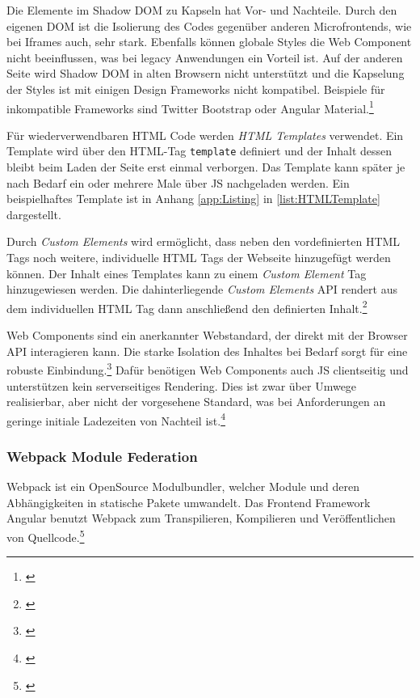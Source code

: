 Die Elemente im Shadow \gls{DOM} zu Kapseln hat Vor- und Nachteile. Durch den eigenen \gls{DOM} ist die Isolierung des Codes gegenüber anderen Microfrontends, wie bei Iframes auch, sehr stark. Ebenfalls können globale Styles die Web Component nicht beeinflussen, was bei legacy Anwendungen ein Vorteil ist. 
Auf der anderen Seite wird Shadow \gls{DOM} in alten Browsern nicht unterstützt und die Kapselung der Styles ist mit einigen Design Frameworks nicht kompatibel. Beispiele für inkompatible Frameworks sind Twitter Bootstrap oder Angular Material.\footnote{\cite[vgl.][96]{Geers2020}}

Für wiederverwendbaren \gls{HTML} Code werden \textit{\gls{HTML} Templates} verwendet. Ein Template wird über den \gls{HTML}-Tag \texttt{template} definiert und der Inhalt dessen bleibt beim Laden der Seite erst einmal verborgen. Das Template kann später je nach Bedarf ein oder mehrere Male über \gls{JS} nachgeladen werden. Ein beispielhaftes Template ist in Anhang \ref{app:Listing} in \cref{list:HTMLTemplate} dargestellt.

Durch \textit{Custom Elements} wird ermöglicht, dass neben den vordefinierten \gls{HTML} Tags noch weitere, individuelle \gls{HTML} Tags der Webseite hinzugefügt werden können. Der Inhalt eines Templates kann zu einem \textit{Custom Element} Tag hinzugewiesen werden. Die dahinterliegende \textit{Custom Elements} API rendert aus dem individuellen \gls{HTML} Tag dann anschließend den definierten Inhalt.\footnote{\cite[vgl.][]{Rauber2021}}

Web Components sind ein anerkannter Webstandard, der direkt mit der Browser \gls{API} interagieren kann. Die starke Isolation des Inhaltes bei Bedarf sorgt für eine robuste Einbindung.\footnote{\cite[vgl.][96\psq]{Geers2020}} Dafür benötigen Web Components auch \gls{JS} clientseitig und unterstützen kein serverseitiges Rendering. Dies ist zwar über Umwege realisierbar, aber nicht der vorgesehene Standard, was bei Anforderungen an geringe initiale Ladezeiten von Nachteil ist.\footnote{\cite[vgl.][97\psq]{Geers2020}}

\subsubsection{Webpack Module Federation}\label{sec:ModuleFederation}

Webpack ist ein OpenSource Modulbundler, welcher Module und deren Abhängigkeiten in statische Pakete umwandelt. Das Frontend Framework Angular benutzt Webpack zum Transpilieren, Kompilieren und Veröffentlichen von Quellcode.\footnote{\cite[vgl.][133]{Clow2018}}

